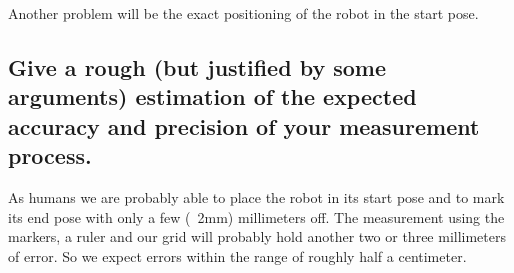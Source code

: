 \documentclass[paper=a4, fontsize=11pt]{scrartcl} %
\numberwithin{equation}{section} %
\numberwithin{figure}{section} %
\numberwithin{table}{section} %
\begin{document}
Another problem will be the exact positioning of the robot in the start pose.

\subsection{Give a rough (but justified by some arguments) estimation of the expected accuracy and precision of your measurement process.}
As humans we are probably able to place the robot in its start pose and to mark its end pose with only a few (~2mm) millimeters off. The measurement using the markers, a ruler and our grid will probably hold another two or three millimeters of error. 
So we expect errors within the range of roughly half a centimeter.
\end{document}
